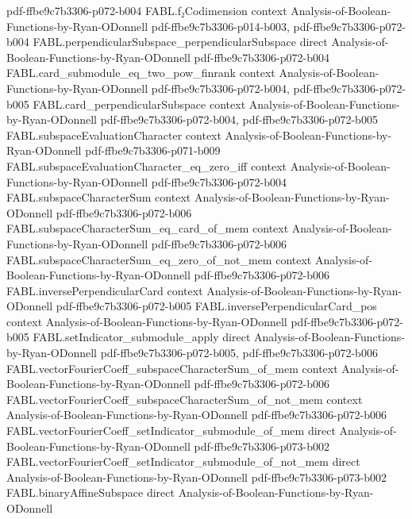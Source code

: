 \begin{theorem}
  {pdf-ffbe9c7b3306-p072-b004}
\proofstep
  {FABL.f₂Codimension}
  {context}
  {Analysis-of-Boolean-Functions-by-Ryan-ODonnell}
  {pdf-ffbe9c7b3306-p014-b003,
    pdf-ffbe9c7b3306-p072-b004}
\proofstep
  {FABL.perpendicularSubspace_perpendicularSubspace}
  {direct}
  {Analysis-of-Boolean-Functions-by-Ryan-ODonnell}
  {pdf-ffbe9c7b3306-p072-b004}
\proofstep
  {FABL.card_submodule_eq_two_pow_finrank}
  {context}
  {Analysis-of-Boolean-Functions-by-Ryan-ODonnell}
  {pdf-ffbe9c7b3306-p072-b004,
    pdf-ffbe9c7b3306-p072-b005}
\proofstep
  {FABL.card_perpendicularSubspace}
  {context}
  {Analysis-of-Boolean-Functions-by-Ryan-ODonnell}
  {pdf-ffbe9c7b3306-p072-b004,
    pdf-ffbe9c7b3306-p072-b005}
\proofstep
  {FABL.subspaceEvaluationCharacter}
  {context}
  {Analysis-of-Boolean-Functions-by-Ryan-ODonnell}
  {pdf-ffbe9c7b3306-p071-b009}
\proofstep
  {FABL.subspaceEvaluationCharacter_eq_zero_iff}
  {context}
  {Analysis-of-Boolean-Functions-by-Ryan-ODonnell}
  {pdf-ffbe9c7b3306-p072-b004}
\proofstep
  {FABL.subspaceCharacterSum}
  {context}
  {Analysis-of-Boolean-Functions-by-Ryan-ODonnell}
  {pdf-ffbe9c7b3306-p072-b006}
\proofstep
  {FABL.subspaceCharacterSum_eq_card_of_mem}
  {context}
  {Analysis-of-Boolean-Functions-by-Ryan-ODonnell}
  {pdf-ffbe9c7b3306-p072-b006}
\proofstep
  {FABL.subspaceCharacterSum_eq_zero_of_not_mem}
  {context}
  {Analysis-of-Boolean-Functions-by-Ryan-ODonnell}
  {pdf-ffbe9c7b3306-p072-b006}
\proofstep
  {FABL.inversePerpendicularCard}
  {context}
  {Analysis-of-Boolean-Functions-by-Ryan-ODonnell}
  {pdf-ffbe9c7b3306-p072-b005}
\proofstep
  {FABL.inversePerpendicularCard_pos}
  {context}
  {Analysis-of-Boolean-Functions-by-Ryan-ODonnell}
  {pdf-ffbe9c7b3306-p072-b005}
\proofstep
  {FABL.setIndicator_submodule_apply}
  {direct}
  {Analysis-of-Boolean-Functions-by-Ryan-ODonnell}
  {pdf-ffbe9c7b3306-p072-b005,
    pdf-ffbe9c7b3306-p072-b006}
\proofstep
  {FABL.vectorFourierCoeff_subspaceCharacterSum_of_mem}
  {context}
  {Analysis-of-Boolean-Functions-by-Ryan-ODonnell}
  {pdf-ffbe9c7b3306-p072-b006}
\proofstep
  {FABL.vectorFourierCoeff_subspaceCharacterSum_of_not_mem}
  {context}
  {Analysis-of-Boolean-Functions-by-Ryan-ODonnell}
  {pdf-ffbe9c7b3306-p072-b006}
\proofstep
  {FABL.vectorFourierCoeff_setIndicator_submodule_of_mem}
  {direct}
  {Analysis-of-Boolean-Functions-by-Ryan-ODonnell}
  {pdf-ffbe9c7b3306-p073-b002}
\proofstep
  {FABL.vectorFourierCoeff_setIndicator_submodule_of_not_mem}
  {direct}
  {Analysis-of-Boolean-Functions-by-Ryan-ODonnell}
  {pdf-ffbe9c7b3306-p073-b002}
\proofstep
  {FABL.binaryAffineSubspace}
  {direct}
  {Analysis-of-Boolean-Functions-by-Ryan-ODonnell}

\end{theorem}
